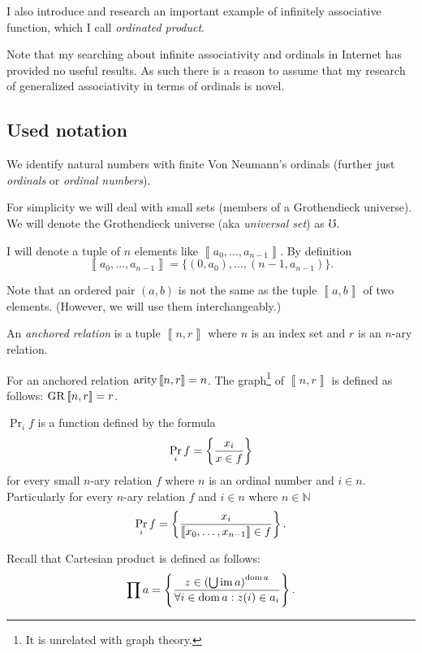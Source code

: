 I also introduce and research an important example of infinitely associative
function, which I call \emph{ordinated product}.

Note that my searching about infinite associativity and ordinals in
Internet has provided no useful results. As such there is a reason
to assume that my research of generalized associativity in terms of
ordinals is novel.


\subsection{Used notation}

We identify natural numbers with finite Von Neumann's
ordinals (further just \emph{ordinals} or \emph{ordinal numbers}).

For simplicity we will deal with small sets (members of a Grothendieck
universe). We will denote the Grothendieck universe (aka \emph{universal
set}) as $\mho$.

I will denote a tuple of $n$ elements like $\left\llbracket a_{0},\ldots,a_{n-1}\right\rrbracket $.
By definition
\[
\left\llbracket a_{0},\ldots,a_{n-1}\right\rrbracket =\{(0,a_{0}),\ldots,(n-1,a_{n-1})\}.
\]


Note that an ordered pair $(a,b)$ is not the same as the tuple $\left\llbracket a,b\right\rrbracket $
of two elements. (However, we will use them interchangeably.)
\begin{defn}
An \emph{anchored relation} is a tuple $\left\llbracket n,r\right\rrbracket $
where $n$ is an index set and $r$ is an $n$-ary relation.
\end{defn}
For an anchored relation $\operatorname{arity}\left\llbracket n,r\right\rrbracket =n$.
The graph\footnote{It is unrelated with graph theory.} of $\left\llbracket n,r\right\rrbracket $
is defined as follows: $\operatorname{GR}\left\llbracket n,r\right\rrbracket =r$.
\begin{defn}
$\Pr_{i}f$ is a function defined by the formula
\[
\Pr_{i}f=\left\{ \frac{x_{i}}{x\in f}\right\}
\]
for every small $n$-ary relation $f$ where $n$ is an ordinal number
and $i\in n$. Particularly for every $n$-ary relation $f$ and $i\in n$
where $n\in\mathbb{N}$
\[
\Pr_{i}f=\left\{ \frac{x_{i}}{\left\llbracket x_{0},\ldots,x_{n-1}\right\rrbracket \in f}\right\}.
\]

\end{defn}
Recall that Cartesian product is defined
as follows:
\[
\prod a=\left\{ \frac{z\in\left(\bigcup\operatorname{im} a\right)^{\operatorname{dom} a}}{\forall i\in\operatorname{dom} a:z(i)\in a_{i}}\right\}.
\]

